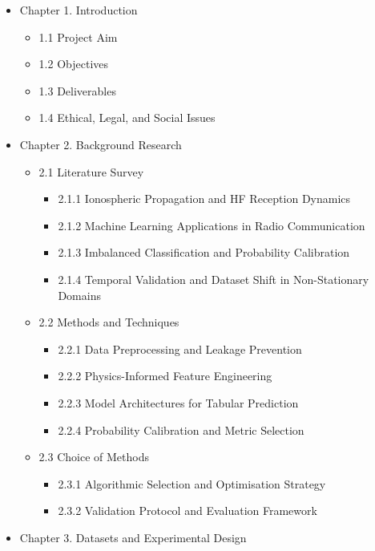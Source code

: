 \begin{itemize}
\tightlist
\item
  Chapter 1. Introduction

  \begin{itemize}
  \tightlist
  \item
    1.1 Project Aim
  \item
    1.2 Objectives
  \item
    1.3 Deliverables
  \item
    1.4 Ethical, Legal, and Social Issues
  \end{itemize}
\item
  Chapter 2. Background Research

  \begin{itemize}
  \tightlist
  \item
    2.1 Literature Survey

    \begin{itemize}
    \tightlist
    \item
      2.1.1 Ionospheric Propagation and HF Reception Dynamics
    \item
      2.1.2 Machine Learning Applications in Radio Communication
    \item
      2.1.3 Imbalanced Classification and Probability Calibration
    \item
      2.1.4 Temporal Validation and Dataset Shift in Non-Stationary
      Domains
    \end{itemize}
  \item
    2.2 Methods and Techniques

    \begin{itemize}
    \tightlist
    \item
      2.2.1 Data Preprocessing and Leakage Prevention
    \item
      2.2.2 Physics-Informed Feature Engineering
    \item
      2.2.3 Model Architectures for Tabular Prediction
    \item
      2.2.4 Probability Calibration and Metric Selection
    \end{itemize}
  \item
    2.3 Choice of Methods

    \begin{itemize}
    \tightlist
    \item
      2.3.1 Algorithmic Selection and Optimisation Strategy
    \item
      2.3.2 Validation Protocol and Evaluation Framework
    \end{itemize}
  \end{itemize}
\item
  Chapter 3. Datasets and Experimental Design


\end{itemize}
